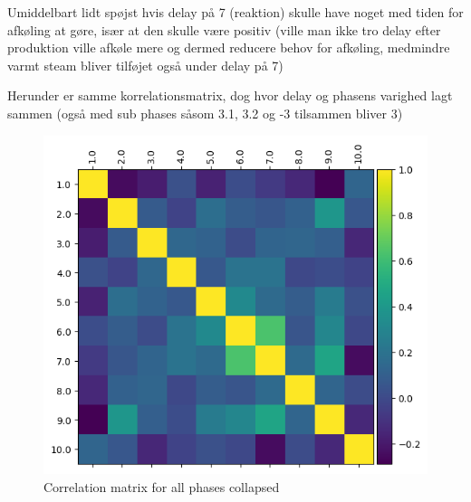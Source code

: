 \documentclass[../Thesis.tex]{subfiles}
\begin{document}
Umiddelbart lidt spøjst hvis delay på 7 (reaktion) skulle have noget med tiden for afkøling at gøre, især at den skulle være positiv (ville man ikke tro delay efter produktion ville afkøle mere og dermed reducere behov for afkøling, medmindre varmt steam bliver tilføjet også under delay på 7)




Herunder er samme korrelationsmatrix, dog hvor delay og phasens varighed lagt sammen (også med sub phases såsom 3.1, 3.2 og -3 tilsammen bliver 3)

\begin{figure}[H]
    \centering
    \includegraphics[width=.9\linewidth]{figures/Multiple cycles data/Correlation matrix collapsed phases.png}
    \caption{Correlation matrix for all phases collapsed}
\end{figure}
\end{document}
